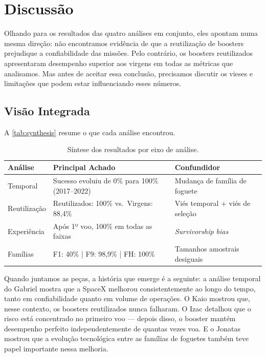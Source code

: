 
\chapter{Discussão}
\label{chap:discussion}

Olhando para os resultados das quatro análises em conjunto, eles apontam numa mesma direção: não encontramos evidência de que a reutilização de boosters prejudique a confiabilidade das missões. Pelo contrário, os boosters reutilizados apresentaram desempenho superior aos virgens em todas as métricas que analisamos. Mas antes de aceitar essa conclusão, precisamos discutir os vieses e limitações que podem estar influenciando esses números.

\section{Visão Integrada}

A \autoref{tab:synthesis} resume o que cada análise encontrou.

\begin{table}[H]
\centering
\caption{Síntese dos resultados por eixo de análise.}
\label{tab:synthesis}
\begin{tabular}{p{3cm}p{5cm}p{4.5cm}}
\toprule
\textbf{Análise} & \textbf{Principal Achado} & \textbf{Confundidor} \\
\midrule
Temporal         & Sucesso evoluiu de 0\% para 100\% (2017--2022) & Mudança de família de foguete \\
Reutilização     & Reutilizados: 100\% vs.\ Virgens: 88,4\%      & Viés temporal + viés de seleção \\
Experiência      & Após 1º voo, 100\% em todas as faixas          & \textit{Survivorship bias} \\
Famílias         & F1: 40\% | F9: 98,9\% | FH: 100\%             & Tamanhos amostrais desiguais \\
\bottomrule
\end{tabular}
\end{table}

Quando juntamos as peças, a história que emerge é a seguinte: a análise temporal do Gabriel mostra que a SpaceX melhorou consistentemente ao longo do tempo, tanto em confiabilidade quanto em volume de operações. O Kaio mostrou que, nesse contexto, os boosters reutilizados nunca falharam. O Izac detalhou que o risco está concentrado no primeiro voo — depois disso, o booster mantém desempenho perfeito independentemente de quantas vezes voa. E o Jonatas mostrou que a evolução tecnológica entre as famílias de foguetes também teve papel importante nessa melhoria.

